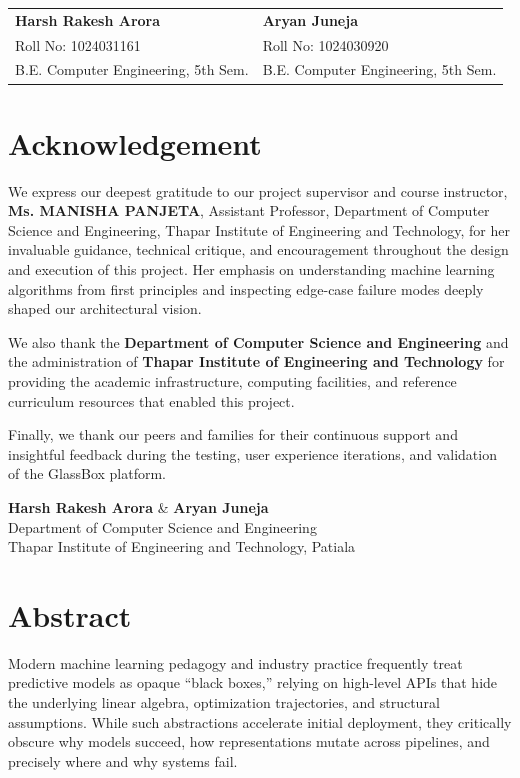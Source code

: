 \documentclass[12pt,a4paper]{report}
\begin{document}
\vspace{2.5cm}
\noindent
\begin{tabular}{p{3.1in}p{3.1in}}
\textbf{Harsh Rakesh Arora} & \textbf{Aryan Juneja} \\
Roll No: 1024031161 & Roll No: 1024030920 \\
B.E. Computer Engineering, 5th Sem. & B.E. Computer Engineering, 5th Sem. \\
\end{tabular}

\newpage

\chapter*{Acknowledgement}
\thispagestyle{fancy}
We express our deepest gratitude to our project supervisor and course instructor, \textbf{Ms. MANISHA PANJETA}, Assistant Professor, Department of Computer Science and Engineering, Thapar Institute of Engineering and Technology, for her invaluable guidance, technical critique, and encouragement throughout the design and execution of this project. Her emphasis on understanding machine learning algorithms from first principles and inspecting edge-case failure modes deeply shaped our architectural vision.

We also thank the \textbf{Department of Computer Science and Engineering} and the administration of \textbf{Thapar Institute of Engineering and Technology} for providing the academic infrastructure, computing facilities, and reference curriculum resources that enabled this project.

Finally, we thank our peers and families for their continuous support and insightful feedback during the testing, user experience iterations, and validation of the GlassBox platform.

\vspace{1.5cm}
\noindent
\textbf{Harsh Rakesh Arora} \& \textbf{Aryan Juneja} \\
Department of Computer Science and Engineering \\
Thapar Institute of Engineering and Technology, Patiala

\newpage

\chapter*{Abstract}
\thispagestyle{fancy}
Modern machine learning pedagogy and industry practice frequently treat predictive models as opaque ``black boxes,'' relying on high-level APIs that hide the underlying linear algebra, optimization trajectories, and structural assumptions. While such abstractions accelerate initial deployment, they critically obscure why models succeed, how representations mutate across pipelines, and precisely where and why systems fail. 
\end{document}
